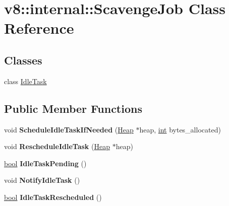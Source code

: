 \hypertarget{classv8_1_1internal_1_1ScavengeJob}{}\section{v8\+:\+:internal\+:\+:Scavenge\+Job Class Reference}
\label{classv8_1_1internal_1_1ScavengeJob}
\subsection*{Classes}
\begin{DoxyCompactItemize}
\item 
class \mbox{\hyperlink{classv8_1_1internal_1_1ScavengeJob_1_1IdleTask}{Idle\+Task}}
\end{DoxyCompactItemize}
\subsection*{Public Member Functions}
\begin{DoxyCompactItemize}
\item 
\mbox{\label{classv8_1_1internal_1_1ScavengeJob_a27884ce03e524dc5039bace60a816137}} 
void {\bfseries Schedule\+Idle\+Task\+If\+Needed} (\mbox{\hyperlink{classv8_1_1internal_1_1Heap}{Heap}} $\ast$heap, \mbox{\hyperlink{classint}{int}} bytes\+\_\+allocated)
\item 
\mbox{\label{classv8_1_1internal_1_1ScavengeJob_ac5836505660266ea4948517856135266}} 
void {\bfseries Reschedule\+Idle\+Task} (\mbox{\hyperlink{classv8_1_1internal_1_1Heap}{Heap}} $\ast$heap)
\item 
\mbox{\label{classv8_1_1internal_1_1ScavengeJob_a203b7877a919ad2d51439a1a7694abf7}} 
\mbox{\hyperlink{classbool}{bool}} {\bfseries Idle\+Task\+Pending} ()
\item 
\mbox{\label{classv8_1_1internal_1_1ScavengeJob_a35e76dd78df598289ea207816fe6f358}} 
void {\bfseries Notify\+Idle\+Task} ()
\item 
\mbox{\label{classv8_1_1internal_1_1ScavengeJob_a17f71605b42c832b29e14d87fa610255}} 
\mbox{\hyperlink{classbool}{bool}} {\bfseries Idle\+Task\+Rescheduled} ()
\end{DoxyCompactItemize}
